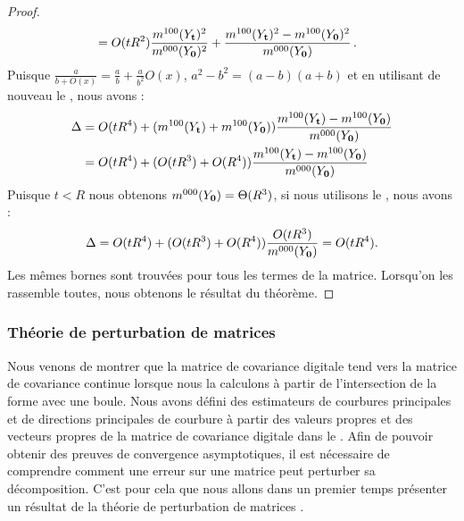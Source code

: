 \begin{proof}
\begin{align}
    &= O(tR^2)\frac{m^{100}(Y_{\mathbf{t}})^2}{m^{000}(Y_{\mathbf{0}})^2} +
    \frac{m^{100}(Y_{\mathbf{t}})^2 - m^{100}(Y_{\mathbf{0}})^2}{m^{000}(Y_{\mathbf{0}})}\,.
  \end{align}
  Puisque $\frac{a}{b+O(x)}=\frac{a}{b}+\frac{a}{b^2}O(x)$, $a^2-b^2=(a-b)(a+b)$
  et en utilisant de nouveau le , nous
  avons :
  \begin{align*}
    \Delta
    &= O(tR^4) + (m^{100}(Y_{\mathbf{t}}) + m^{100}(Y_{\mathbf{0}}))\frac{m^{100}(Y_{\mathbf{t}}) - m^{100}(Y_{\mathbf{0}})}{m^{000}(Y_{\mathbf{0}})} \\
    &= O(tR^4) + (O(tR^3)+O(R^4))\frac{m^{100}(Y_{\mathbf{t}}) - m^{100}(Y_{\mathbf{0}})}{m^{000}(Y_{\mathbf{0}})}
  \end{align*}
  Puisque $t < R$ nous obtenons $m^{000}(Y_{\mathbf{0}}) = \Theta(R^3)$, si nous
  utilisons le , nous avons :
  \begin{equation}
    \Delta = O(tR^4) + (O(tR^3)+O(R^4))\frac{O(tR^3)}{m^{000}(Y_{\mathbf{0}})} = O(tR^4).
  \end{equation}
  Les mêmes bornes sont trouvées pour tous les termes de la matrice. Lorsqu'on
  les rassemble toutes, nous obtenons le résultat du théorème.
  \end{proof}
%
\subsubsection{Théorie de perturbation de matrices}
%
Nous venons de montrer que la matrice de covariance digitale tend vers la
matrice de covariance continue lorsque nous la calculons à partir de
l'intersection de la forme avec une boule. Nous avons défini des estimateurs de
courbures principales et de directions principales de courbure à partir des
valeurs propres et des vecteurs propres de la matrice de covariance digitale
dans le . Afin de pouvoir obtenir des
preuves de convergence asymptotiques, il est nécessaire de comprendre comment une
erreur sur une matrice peut perturber sa décomposition. C'est pour cela que nous
allons dans un premier temps présenter un résultat de la théorie de perturbation
de matrices \cite{Bauer1960,Stewart1990,Bhatia1997}.


